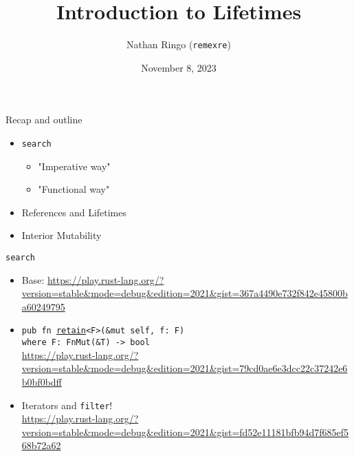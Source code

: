 \documentclass[aspectratio=169, notes]{beamer}
\title{Introduction to Lifetimes}
\author{Nathan Ringo (\texttt{remexre})}
\date{November 8, 2023}
\begin{document}
\frame{\titlepage}

\begin{frame}{Recap and outline}
	\begin{itemize}
		\item \texttt{search}
		\begin{itemize}
			\item "Imperative way"
			\item "Functional way"
		\end{itemize}
		\item References and Lifetimes
		\item Interior Mutability
	\end{itemize}
\end{frame}

\begin{frame}{\texttt{search}}
	\begin{itemize}
	\item<+-> Base: \url{https://play.rust-lang.org/?version=stable&mode=debug&edition=2021&gist=367a4490e732f842e45800ba60249795}
	\vspace{0.3in}
	\item<+-> \texttt{pub fn \href{https://doc.rust-lang.org/std/vec/struct.Vec.html\#method.retain}{\texttt{retain}}<F>(\&mut self, f: F)} \\
		\quad\texttt{where F: FnMut(\&T) -> bool} \\
		\url{https://play.rust-lang.org/?version=stable&mode=debug&edition=2021&gist=79cd0ae6e3dcc22c37242e6b0bf0bdff}
	\vspace{0.3in}
	\item<+-> Iterators and \texttt{filter}! \\
		\url{https://play.rust-lang.org/?version=stable&mode=debug&edition=2021&gist=fd52e11181bfb94d7f685ef568b72a62}
	\end{itemize}
\end{frame}
\end{document}
